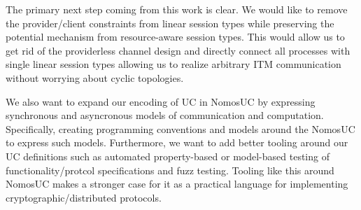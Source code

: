 The primary next step coming from this work is clear.
We would like to remove the provider/client constraints from linear session types while preserving the potential mechanism from resource-aware session types.
This would allow us to get rid of the providerless channel design and directly connect all processes with single linear session types allowing us to realize arbitrary
ITM communication without worrying about cyclic topologies.

We also want to expand our encoding of UC in NomosUC by expressing synchronous and asyncronous models of communication and computation. 
Specifically, creating programming conventions and models around the NomosUC to express such models.
Furthermore, we want to add better tooling around our UC definitions such as automated property-based or model-based testing of functionality/protcol specifications and fuzz testing. 
Tooling like this around NomosUC makes a stronger case for it as a practical language for implementing cryptographic/distributed protocols.
